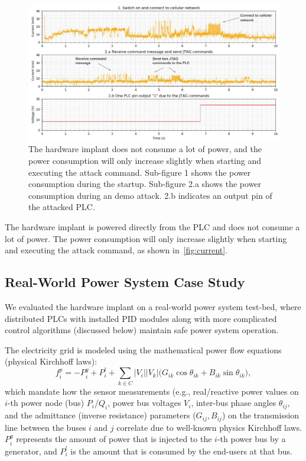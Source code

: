 \begin{figure}[h]
	\includegraphics[width=\textwidth]{figures/current}
	\centering
	\caption{The hardware implant does not consume a lot of power, and the power consumption will only increase slightly when starting and executing the attack command. Sub-figure 1 shows the power consumption during the startup. Sub-figure 2.a shows the power consumption during an demo attack. 2.b indicates an output pin of the attacked PLC. }
	\label{fig:current}
\end{figure}

The hardware implant is powered directly from the PLC and does not consume a lot of power. The power consumption will only increase slightly when starting and executing the attack command, as shown in~\autoref{fig:current}.



\subsection{Real-World Power System Case Study}

We evaluated the hardware implant on a real-world power system test-bed, where distributed PLCs with installed PID modules along with more complicated control algorithms (discussed below) maintain safe power system operation. 

The electricity grid is modeled using the mathematical power flow equations (physical Kirchhoff laws): 
\begin{equation}
\label{eq:powerflowreal}
f_i^p = -P_i^g+P_i^l + \sum_{k \in C}{|V_i||V_k| (G_{ik} \cos{\theta_{ik}} + B_{ik} \sin{\theta_{ik}}}),
\end{equation}
which mandate how the sensor measurements (e.g., real/reactive power values on $i$-th power node (bus) $P_i$/$Q_i$, power bus voltages $V_i$, inter-bus phase angles $\theta_{ij}$, and the admittance (inverse resistance) parameters ($G_{ij}, B_{ij}$) on the transmission line between the buses $i$ and $j$ correlate due to well-known physics Kirchhoff laws. $P_i^g$ represents the amount of power that is injected to the $i$-th power bus by a generator, and $P_i^l$ is the amount that is consumed by the end-users at that bus. 



